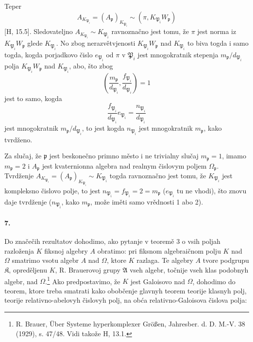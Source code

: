 \documentclass[11pt]{article}
\newcommand{\foreign}[1]{#1}
\begin{document}
Teper
\[
        A_{K_{\mathfrak P_i}}=(A_{\mathfrak p})_{K_{\mathfrak P_i}}\sim(\pi,K_{\mathfrak P_i}W_{\mathfrak p})
\]
[H, 15.5]. Sledovateljno \(A_{K_{\mathfrak P_i}}\sim K_{\mathfrak P_i}\) ravnoznačno jest tomu, že \(\pi\) jest norma iz \(K_{\mathfrak P_i}W_{\mathfrak p}\) glede \(K_{\mathfrak P_i}\). No zbog nerazvětvjenosti \(K_{\mathfrak P_i}W_{\mathfrak p}\) nad \(K_{\mathfrak P_i}\) to biva togda i samo togda, kogda porjadkovo čislo \(e_{\mathfrak P_i}\) od \(\pi\) v \(\mathfrak P_i\) jest mnogokratnik stepenja \(m_{\mathfrak p}/d_{\mathfrak P_i}\) polja \(K_{\mathfrak P_i}W_{\mathfrak p}\) nad \(K_{\mathfrak P_i}\), abo, što zbog
\[
\left(\frac{m_{\mathfrak p}}{d_{\mathfrak P_i}},\frac{f_{\mathfrak P_i}}{d_{\mathfrak P_i}}\right)=1
\]
jest to samo, kogda
\[
\frac{f_{\mathfrak P_i}}{d_{\mathfrak P_i}}e_{\mathfrak P_i}=\frac{n_{\mathfrak P_i}}{d_{\mathfrak P_i}}
\]
jest mnogokratnik \(m_{\mathfrak p}/d_{\mathfrak P_i}\), to jest kogda \(n_{\mathfrak P_i}\) jest mnogokratnik \(m_{\mathfrak p}\), kako tvrdženo.

Za slučaj, že \(\mathfrak p\) jest beskonečno primno město i ne trivialny slučaj \(m_{\mathfrak p}=1\), imamo \(m_{\mathfrak p}=2\) i \(A_{\mathfrak p}\) jest kvaternionna algebra nad realnym čislovym poljem \(\Omega_{\mathfrak p}\). Tvrdženje \(A_{K_{\mathfrak P_i}}=(A_{\mathfrak p})_{K_{\mathfrak P_i}}\sim K_{\mathfrak P_i}\) togda ravnoznačno jest tomu, že \(K_{\mathfrak P_i}\) jest kompleksno čislovo polje, to jest \(n_{\mathfrak P_i}=f_{\mathfrak P_i}=2=m_{\mathfrak p}\) (\(e_{\mathfrak P_i}\) tu ne vhodi), što znovu daje tvrdženje (\(n_{\mathfrak P_i}\), kako \(m_{\mathfrak p}\), može iměti samo vrědnosti 1 abo 2).

\paragraph{7.}
Do značečih rezultatov dohodimo, ako pytanje v teoremě 3 o vsih poljah razloženja \(K\) fiksnoj algebry \(A\) obratimo: pri fiksnom algebraičnom polju \(K\) nad \(\Omega\) smatrimo vsotu algebr \(A\) nad \(\Omega\), ktore \(K\) razlaga. Te algebry \(A\) tvore podgrupu \(\mathfrak K\), opreděljenu \(K\), R. Brauerovoj grupy \(\mathfrak A\) vseh algebr, točnije vseh klas podobnyh algebr, nad \(\Omega\).\footnote{\foreign{R. Brauer, Über Systeme hyperkomplexer Größen, Jahresber. d. D. M.-V. 38 (1929), s. 47/48.} Vidi takože H, 13.1.} Ako predpostavimo, že \(K\) jest Galoisovo nad \(\Omega\), dohodimo do teorem, ktore treba smatrati kako obobčenje glavnyh teorem teorije klasnyh polj, teorije relativno-abelovyh čislovyh polj, na obća relativno-Galoisova čislova polja:
\end{document}
